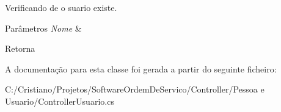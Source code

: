 Verificando de o suario existe. 


\begin{DoxyParams}{Parâmetros}
{\em Nome} & \\
\hline
\end{DoxyParams}
\begin{DoxyReturn}{Retorna}

\end{DoxyReturn}


A documentação para esta classe foi gerada a partir do seguinte ficheiro\+:\begin{DoxyCompactItemize}
\item 
C\+:/\+Cristiano/\+Projetos/\+Software\+Ordem\+De\+Servico/\+Controller/\+Pessoa e Usuario/Controller\+Usuario.\+cs\end{DoxyCompactItemize}
